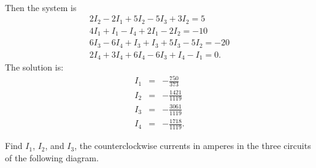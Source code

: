 \begin{enumialphparenastyle}
\begin{ex}
\begin{sol}
\begin{eqnarray*}
    \end{eqnarray*}
    Then the system is 
    \begin{equation*}
      \begin{array}{c}
        2I_{2}-2I_{1}+5I_{2}-5I_{3}+3I_{2}=5 \\
        4I_{1}+I_{1}-I_{4}+2I_{1}-2I_{2}=-10 \\
        6I_{3}-6I_{4}+I_{3}+I_{3}+5I_{3}-5I_{2}=-20 \\
        2I_{4}+3I_{4}+6I_{4}-6I_{3}+I_{4}-I_{1}=0.
      \end{array}
    \end{equation*}
    The solution is:
    \begin{eqnarray*}
      I_{1}&=& -\frac{750}{373} \\
      I_{2}&=& -\frac{1421}{1119} \\
      I_{3}&=& -\frac{3061}{1119} \\
      I_{4}&=& -\frac{1718}{1119}.
    \end{eqnarray*}
  \end{sol}
\end{ex}

\begin{ex} Find $I_{1}$, $I_{2}$, and $I_{3}$, the counterclockwise currents in
  amperes in the three circuits of the following diagram.
  
  \begin{center}
  \end{center}
  

\end{ex}
\end{enumialphparenastyle}
